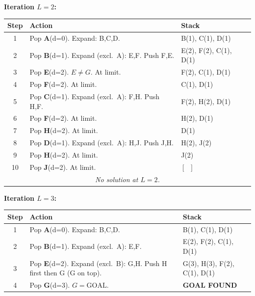 \documentclass[12pt, a4paper]{article}
\newcommand{\goal}{\textcolor{green!55!black}{\textbf{GOAL FOUND}}}
\begin{document}
\vspace{0.6em}

\noindent\textbf{Iteration $L = 2$:}
\begin{center}
\renewcommand{\arraystretch}{1.2}
\begin{tabular}{c|l|p{8.5cm}}
\toprule
\textbf{Step} & \textbf{Action} & \textbf{Stack} \\
\midrule
1  & Pop \textbf{A}(d=0). Expand: B,C,D.
   & B(1), C(1), D(1) \\
2  & Pop \textbf{B}(d=1). Expand (excl.\ A): E,F. Push F,E.
   & E(2), F(2), C(1), D(1) \\
3  & Pop \textbf{E}(d=2). $E \neq G$. At limit.
   & F(2), C(1), D(1) \\
4  & Pop \textbf{F}(d=2). At limit.
   & C(1), D(1) \\
5  & Pop \textbf{C}(d=1). Expand (excl.\ A): F,H. Push H,F.
   & F(2), H(2), D(1) \\
6  & Pop \textbf{F}(d=2). At limit.
   & H(2), D(1) \\
7  & Pop \textbf{H}(d=2). At limit.
   & D(1) \\
8  & Pop \textbf{D}(d=1). Expand (excl.\ A): H,J. Push J,H.
   & H(2), J(2) \\
9  & Pop \textbf{H}(d=2). At limit.
   & J(2) \\
10 & Pop \textbf{J}(d=2). At limit.
   & $[\;\;]$ \\
\midrule
\multicolumn{3}{c}{\textit{No solution at $L=2$.}} \\
\bottomrule
\end{tabular}
\end{center}

\vspace{0.6em}

\noindent\textbf{Iteration $L = 3$:}
\begin{center}
\renewcommand{\arraystretch}{1.2}
\begin{tabular}{c|l|p{8.5cm}}
\toprule
\textbf{Step} & \textbf{Action} & \textbf{Stack} \\
\midrule
1 & Pop \textbf{A}(d=0). Expand: B,C,D.
  & B(1), C(1), D(1) \\
2 & Pop \textbf{B}(d=1). Expand (excl.\ A): E,F.
  & E(2), F(2), C(1), D(1) \\
3 & Pop \textbf{E}(d=2). Expand (excl.\ B): G,H. Push H first then G (G on top).
  & G(3), H(3), F(2), C(1), D(1) \\
4 & Pop \textbf{G}(d=3). $G = \mathrm{GOAL}$.
  & \goal \\
\bottomrule
\end{tabular}
\end{center}
\end{document}
